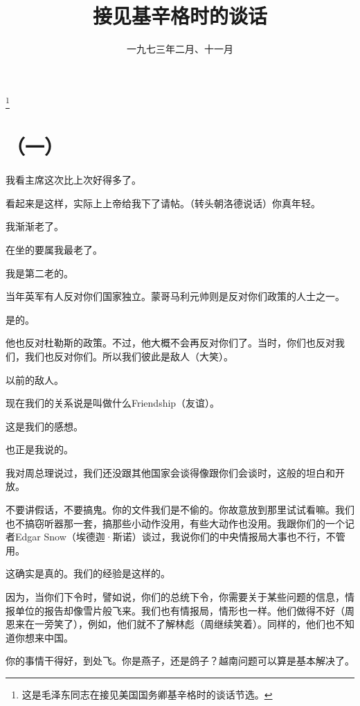 
\title{接见基辛格时的谈话}
\date{一九七三年二月、十一月}
\thanks{这是毛泽东同志在接见美国国务卿基辛格时的谈话节选。}
\maketitle


\section*{（一）}

我看主席这次比上次好得多了。

看起来是这样，实际上上帝给我下了请帖。（转头朝洛德说话）你真年轻。

我渐渐老了。

在坐的要属我最老了。

我是第二老的。

当年英军有人反对你们国家独立。蒙哥马利元帅则是反对你们政策的人士之一。

是的。

他也反对杜勒斯的政策。不过，他大概不会再反对你们了。当时，你们也反对我们，我们也反对你们。所以我们彼此是敌人（大笑）。

以前的敌人。

现在我们的关系说是叫做什么Friendship（友谊）。

这是我们的感想。

也正是我说的。

我对周总理说过，我们还没跟其他国家会谈得像跟你们会谈时，这般的坦白和开放。

不要讲假话，不要搞鬼。你的文件我们是不偷的。你故意放到那里试试看嘛。我们也不搞窃听器那一套，搞那些小动作没用，有些大动作也没用。我跟你们的一个记者Edgar Snow（埃德迦·斯诺）谈过，我说你们的中央情报局大事也不行，不管用。

这确实是真的。我们的经验是这样的。

因为，当你们下令时，譬如说，你们的总统下令，你需要关于某些问题的信息，情报单位的报告却像雪片般飞来。我们也有情报局，情形也一样。他们做得不好（周恩来在一旁笑了），例如，他们就不了解林彪（周继续笑着）。同样的，他们也不知道你想来中国。

你的事情干得好，到处飞。你是燕子，还是鸽子？越南问题可以算是基本解决了。

